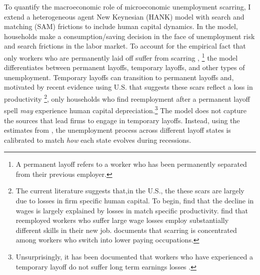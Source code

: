 To quantify the macroeconomic role of microeconomic unemployment scarring, I extend a heterogeneous agent New Keynesian (HANK) model with search and matching (SAM) frictions to include human capital dynamics. In the model, households make a consumption/saving decision in the face of unemployment risk and search frictions in the labor market. To account for the empirical fact that only workers who are permanently laid off suffer from scarring \citep{ Fujita2016}, \footnote{A permanent layoff refers to a worker who has been permanently separated from their previous employer.} the model differentiates between permanent layoffs, temporary layoffs, and other types of unemployment. Temporary layoffs can transition to permanent layoffs and, motivated by recent evidence using U.S. that suggests these scars reflect a loss in productivity \footnote{ The current literature suggests that,in the U.S., the these scars are largely due to losses in firm specific human capital. To begin, \cite{Lachowska2020} find that the decline in wages is largely explained by losses in match specific productivity. \cite{Poletaev2008} find that reemployed workers who suffer large wage losses employ substantially different skills in their new job. \cite{Huckfeldt2022} documents that scarring is concentrated among workers who switch into lower paying occupations.}, only households who find reemployment after a permanent layoff spell \textit{may} experience human capital depreciation.\footnote{Unsurprisingly, it has been documented that workers who have experienced a temporary layoff do not suffer long term earnings losses \citep{Fujita2016}.} The model does not capture the sources that lead firms to engage in temporary layoffs. Instead, using the estimates from \cite{Gertler2022}, the unemployment process across different layoff states is calibrated to match \textit{how} each state evolves during recessions.%

